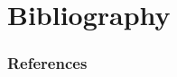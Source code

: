 \documentclass{beamer}
\begin{document}
\section{Bibliography}

\begin{frame}[allowframebreaks]
  \frametitle{References}
  \printbibliography
\end{frame}
\end{document}
